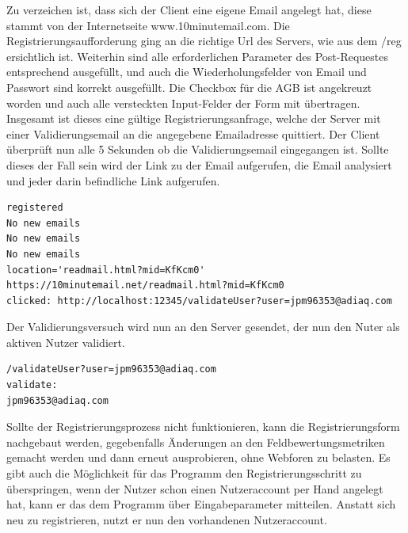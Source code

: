 Zu verzeichen ist, dass sich der Client eine eigene Email angelegt hat, diese stammt von der Internetseite www.10minutemail.com.
Die Registrierungsaufforderung ging an die richtige Url des Servers, wie aus dem /reg ersichtlich ist. Weiterhin sind alle erforderlichen Parameter des Post-Requestes entsprechend ausgefüllt, und auch die Wiederholungsfelder von Email und Passwort sind korrekt ausgefüllt. Die Checkbox für die AGB ist angekreuzt worden und auch alle versteckten Input-Felder der Form mit übertragen. Insgesamt ist dieses eine gültige Registrierungsanfrage, welche der Server mit einer Validierungsemail an die angegebene Emailadresse quittiert.
\newpage
Der Client überprüft nun alle 5 Sekunden ob die Validierungsemail eingegangen ist. Sollte dieses der Fall sein wird der Link zu der Email aufgerufen, die Email analysiert und jeder darin befindliche Link aufgerufen.
\begin{lstlisting}[language=HTML5]
registered
No new emails
No new emails
No new emails
location='readmail.html?mid=KfKcm0'
https://10minutemail.net/readmail.html?mid=KfKcm0
clicked: http://localhost:12345/validateUser?user=jpm96353@adiaq.com
\end{lstlisting}
Der Validierungsversuch wird nun an den Server gesendet, der nun den Nuter als aktiven Nutzer validiert.
\begin{lstlisting}[language=HTML5]
/validateUser?user=jpm96353@adiaq.com
validate:
jpm96353@adiaq.com
\end{lstlisting}
Sollte der Registrierungsprozess nicht funktionieren, kann die Registrierungsform nachgebaut werden, gegebenfalls Änderungen an den Feldbewertungsmetriken gemacht werden und dann erneut ausprobieren, ohne Webforen zu belasten. Es gibt auch die Möglichkeit für das Programm den Registrierungsschritt zu überspringen, wenn der Nutzer schon einen Nutzeraccount per Hand angelegt hat, kann er das dem Programm über Eingabeparameter mitteilen. Anstatt sich neu zu registrieren, nutzt er nun den vorhandenen Nutzeraccount.
\newpage
